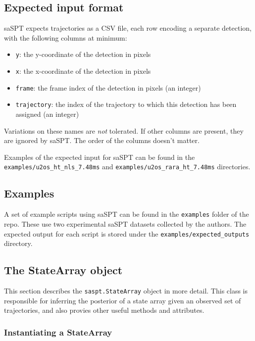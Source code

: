 \documentclass{article}
\begin{document}
\subsection{Expected input format}

saSPT expects trajectories as a CSV file, each row encoding a separate
detection, with the following columns at minimum:
\begin{itemize}
    \item \verb|y|: the y-coordinate of the detection in pixels
    \item \verb|x|: the x-coordinate of the detection in pixels
    \item \verb|frame|: the frame index of the detection in pixels (an integer)
    \item \verb|trajectory|: the index of the trajectory to which this detection has been assigned (an integer)
\end{itemize}

Variations on these names are \emph{not} tolerated.
If other columns are present, they are ignored by saSPT.
The order of the columns doesn't matter.

Examples of the expected input for saSPT can be found in the 
\verb|examples/u2os_ht_nls_7.48ms| and \verb|examples/u2os_rara_ht_7.48ms|
directories.

\subsection{Examples}

A set of example scripts using saSPT can be found in the 
\verb|examples| folder of the repo. These use two experimental
saSPT datasets collected by the authors. The expected output
for each script is stored under the \verb|examples/expected_outputs|
directory.

\subsection{The StateArray object}\label{sect:statearray}

This section describes the \verb|saspt.StateArray| object in more detail.
This class is responsible for inferring the posterior of a state array
given an observed set of trajectories, and also provies other useful methods
and attributes.

\subsubsection{Instantiating a StateArray}
\end{document}
